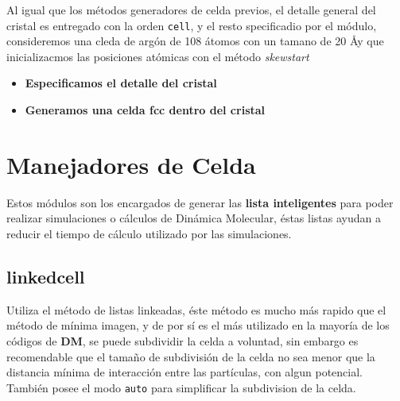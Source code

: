 
Al igual que los m\'etodos generadores de celda previos, el detalle general del cristal es entregado con la orden \verb|cell|, y el resto specificadio por el m\'odulo, consideremos una cleda de arg\'on de 108 \'atomos con un tamano de 20 \AA y que inicializacmos las posiciones at\'omicas con el m\'etodo \textit{skewstart}

\begin{itemize}
 \item \textbf{Especificamos el detalle del cristal}
 \item \textbf{Generamos una celda  fcc dentro del cristal}
\end{itemize}
\section{Manejadores de Celda}
Estos m\'odulos son los encargados de generar las \textbf{lista inteligentes} para poder realizar simulaciones o c\'alculos de Din\'amica Molecular, \'estas listas ayudan a reducir el tiempo de c\'alculo utilizado por las simulaciones.

\subsection{linkedcell}
Utiliza el m\'etodo de listas linkeadas, \'este m\'etodo es mucho m\'as rapido que el m\'etodo de m\'inima imagen, y de por s\'i es el m\'as utilizado en la mayor\'ia de los c\'odigos de \textbf{DM}, se puede subdividir la celda a voluntad, sin embargo es recomendable que el tama\~no de subdivisi\'on de la celda no sea menor que la distancia m\'inima de interacci\'on entre las part\'iculas, con algun potencial. Tambi\'en posee el modo \verb|auto| para simplificar la subdivision de la celda.

